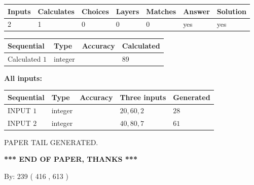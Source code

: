 \documentclass{ctexart}
\begin{document}
   
\noindent\begin{tabular}{|l|l|l|l|l|l|l|}
 \hline
Inputs & Calculates & Choices & Layers & Matches & Answer & Solution \\ \hline
 2  & 
 1  & 
 0
  & 
 0  & 
 0  & 
  yes & 
  yes 
  \\ \hline
 \end{tabular}
   
   
   
   
\noindent{}
   
   
  
  
\noindent\begin{tabular}{|l|l|l|l|}
\hline
 Sequential & Type & Accuracy & Calculated \\ 
\hline
 
 
  Calculated $  1 $ & integer &  & 
  $ 89 $ 
 \\  \hline  
 \end{tabular}
   
   
   
   
\noindent\vspace{0.1in}\hspace{-0.08in} {\textbf{\Large{All inputs: }}}
   
   
  
  
\noindent\begin{tabular}{|l|l|l|l|l|}
\hline
 Sequential & Type & Accuracy & Three inputs & Generated \\ 
\hline
 
 
  INPUT $  1 $ & integer &  & $
 20
 , 
 60
 , 
 2
 $ & $ 28 $ 
 \\  \hline  
 
 
  INPUT $  2 $ & integer &  & $
 40
 , 
 80
 , 
 7
 $ & $ 61 $ 
 \\  \hline  
 \end{tabular}
   
   
   
   
   
   
 \vspace{0.2in}
 
   
   
\vspace{2.0in} PAPER TAIL GENERATED.
   
   
   
   
\vspace{1.0in} 
{\textbf{\large{ *** END OF PAPER, THANKS *** }}} 
   
   
\hspace{1.0in} By: 
 239 ( 416 ,  613 )
   
\end{document}

